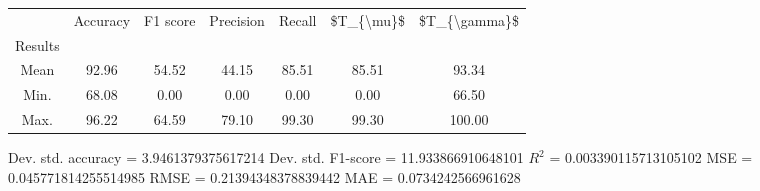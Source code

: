 \begin{tabular}{|c|c|c|c|c|c|c|}
\toprule
{} &  Accuracy &  F1 score &  Precision &  Recall &  \$T\_\{\textbackslash mu\}\$ &  \$T\_\{\textbackslash gamma\}\$ \\
Results &           &           &            &         &            &               \\
\hline
Mean    &     92.96 &     54.52 &      44.15 &   85.51 &      85.51 &         93.34 \\
Min.    &     68.08 &      0.00 &       0.00 &    0.00 &       0.00 &         66.50 \\
Max.    &     96.22 &     64.59 &      79.10 &   99.30 &      99.30 &        100.00 \\
\bottomrule
\end{tabular}

 Dev. std. accuracy = 3.9461379375617214
 Dev. std. F1-score = 11.933866910648101
 $R^2$ = 0.003390115713105102
 MSE = 0.045771814255514985
 RMSE = 0.21394348378839442
 MAE = 0.0734242566961628